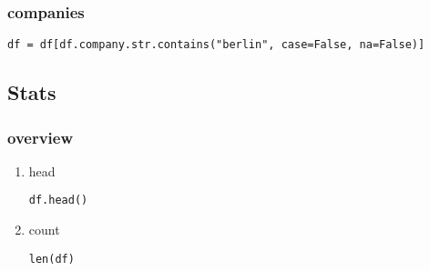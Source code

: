 \documentclass[11pt]{article}
\begin{document}
\subsubsection{companies}
\label{sec:org67abcfe}
\begin{verbatim}
df = df[df.company.str.contains("berlin", case=False, na=False)]
\end{verbatim}
\subsection{Stats}
\label{sec:org2c2c7f7}
\subsubsection{overview}
\label{sec:org0770043}
\begin{enumerate}
\item head
\label{sec:org18ae5c0}
\begin{verbatim}
df.head()
\end{verbatim}

\item count
\label{sec:org3991554}
\begin{verbatim}
len(df)
\end{verbatim}
\end{enumerate}
\end{document}
